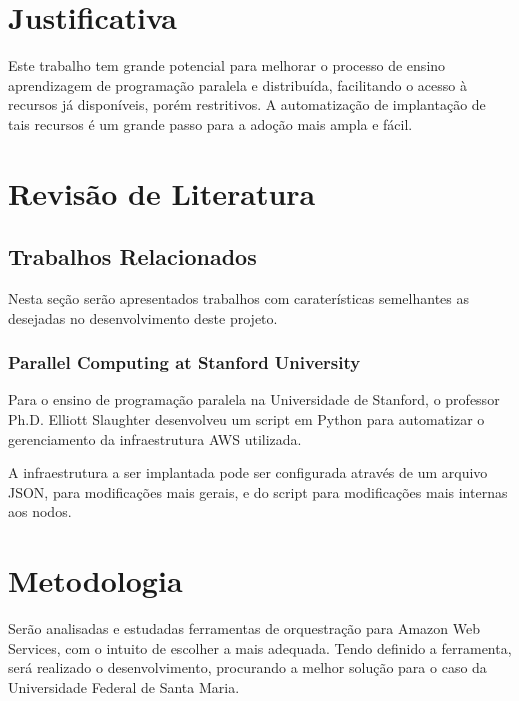 \documentclass[12pt]{article}
\begin{document}
\section{Justificativa}
Este trabalho tem grande potencial para melhorar o processo de ensino aprendizagem de programação paralela e distribuída, facilitando o acesso à recursos já disponíveis, porém restritivos. A automatização de implantação de tais recursos é um grande passo para a adoção mais ampla e fácil.


\section{Revisão de Literatura}

\subsection{Trabalhos Relacionados}
Nesta seção serão apresentados trabalhos com caraterísticas semelhantes as desejadas no desenvolvimento deste projeto.

\subsubsection{Parallel Computing at Stanford University}
Para o ensino de programação paralela na Universidade de Stanford, o professor Ph.D. Elliott Slaughter desenvolveu um script em Python para automatizar o gerenciamento da infraestrutura AWS utilizada.

A infraestrutura a ser implantada pode ser configurada através de um arquivo JSON, para modificações mais gerais, e do script para modificações mais internas aos nodos.


\section{Metodologia}
Serão analisadas e estudadas ferramentas de orquestração para Amazon Web Services, com o intuito de escolher a mais adequada. Tendo definido a ferramenta, será realizado o desenvolvimento, procurando a melhor solução para o caso da Universidade Federal de Santa Maria.
\end{document}
